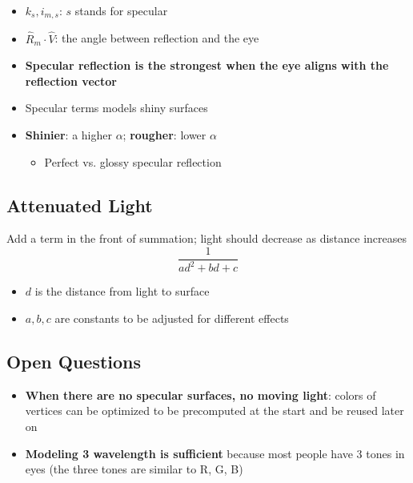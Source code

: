     \begin{itemize}
      \item $ k_{s}, i_{m, s} $: $ s $ stands for specular
      \item $ \hat{R}_{m} \cdot \hat{V} $: the angle between reflection and
      the eye
      \item \textbf{Specular reflection is the strongest when the eye aligns
      with the reflection vector}
      \item Specular terms models shiny surfaces
      \item \textbf{Shinier}: a higher $ \alpha $; \textbf{rougher}:
      lower $ \alpha $
      \begin{itemize}
        \item Perfect vs. glossy specular reflection
      \end{itemize}
    \end{itemize}

\subsection{Attenuated Light}

    Add a term in the front of summation; light should decrease as distance
    increases
    \begin{equation*}
      \frac{1}{ad^{2} + bd + c}
    \end{equation*}

    \begin{itemize}
      \item $ d $ is the distance from light to surface
      \item $ a, b, c $ are constants to be adjusted for different effects
    \end{itemize}

\subsection{Open Questions}

  \begin{itemize}
    \item \textbf{When there are no specular surfaces, no moving light}:
    colors of vertices can be optimized to be precomputed at the start and
    be reused later on

    \item \textbf{Modeling 3 wavelength is sufficient} because most people
    have 3 tones in eyes (the three tones are similar to R, G, B)
  \end{itemize}

